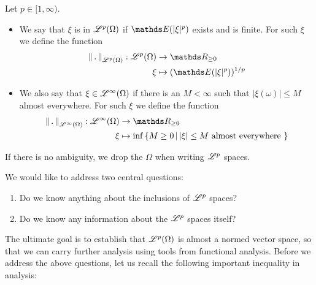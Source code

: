 \begin{definition} Let $p \in [1,\infty)$.
\begin{itemize}
    \item We say that $\xi$ is in $\mathcal{L}^p(\Omega)$ if $\E(|\xi|^p)$ exists and is finite. For such $\xi$ we define the function
    \begin{align}
        \norm{\,.\,}_{\L^p(\Omega)} : \L^p(\Omega) &\to \R_{\geq 0} \\
        \xi &\mapsto (\E(|\xi|^p))^{1/p}
    \end{align}
    \item We also say that $\xi \in \mathcal{L}^\infty(\Omega)$ if there is an $M < \infty$ such that $|\xi(\omega)|\leq M$ almost everywhere. For such $\xi$ we define the function
    \begin{align}
        \norm{\,.\,}_{\L^\infty(\Omega)} : \L^\infty(\Omega) &\to \R_{\geq 0} \\
        \xi &\mapsto \inf \set{M \geq 0 \,|\, |\xi| \leq M \text{ almost everywhere }}
    \end{align}
    \end{itemize}
    If there is no ambiguity, we drop the $\Omega$ when writing $\mathcal{L}^p$ spaces.
\end{definition}

We would like to address two central questions:
\begin{enumerate}
    \item Do we know anything about the inclusions of $\mathcal{L}^p$ spaces?
    \item Do we know any information about the $\mathcal{L}^p$ spaces itself?
\end{enumerate}

The ultimate goal is to establish that $\mathcal{L}^p(\Omega)$ is almost a normed vector space, so that we can carry further analysis using tools from functional analysis. Before we address the above questions, let us recall the following important inequality in analysis:

